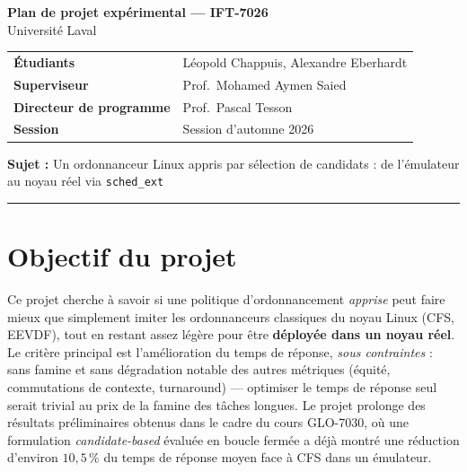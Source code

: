 \documentclass[11pt,a4paper]{article}
\newcommand{\projetTitre}{Plan de projet expérimental — IFT-7026}
\newcommand{\projetSujet}{Un ordonnanceur Linux appris par sélection de
  candidats : de l'émulateur au noyau réel via \texttt{sched\_ext}}
\newcommand{\projetSuperviseur}{Prof.\ Mohamed Aymen Saied}
\newcommand{\projetDirecteur}{Prof.\ Pascal Tesson}
\newcommand{\projetEtudiantUn}{Léopold Chappuis}
\newcommand{\projetEtudiantDeux}{Alexandre Eberhardt}
\newcommand{\projetSession}{Session d'automne 2026}
\newcommand{\projetUniversite}{Université Laval}
\begin{document}
\begin{center}
  {\LARGE\bfseries \projetTitre}\\[0.4em]
  {\large \projetUniversite}
\end{center}

\vspace{0.8em}
\noindent
\begin{tabular}{@{}ll@{}}
  \textbf{Étudiants}              & \projetEtudiantUn{}, \projetEtudiantDeux \\
  \textbf{Superviseur}            & \projetSuperviseur \\
  \textbf{Directeur de programme} & \projetDirecteur \\
  \textbf{Session}                & \projetSession \\
\end{tabular}

\vspace{0.6em}
\noindent\textbf{Sujet :} \projetSujet

\vspace{0.4em}
\hrule
\vspace{1.2em}

\section{Objectif du projet}
Ce projet cherche à savoir si une politique d'ordonnancement \emph{apprise} peut
faire mieux que simplement imiter les ordonnanceurs classiques du noyau Linux
(CFS, EEVDF), tout en restant assez légère pour être \textbf{déployée dans un
noyau réel}. Le critère principal est l'amélioration du temps de réponse,
\emph{sous contraintes} : sans famine et sans dégradation notable des autres
métriques (équité, commutations de contexte, turnaround) — optimiser le temps
de réponse seul serait trivial au prix de la famine des tâches longues. Le
projet prolonge des résultats préliminaires obtenus dans le
cadre du cours GLO-7030, où une formulation \emph{candidate-based} évaluée en
boucle fermée a déjà montré une réduction d'environ \mbox{$10{,}5\,\%$} du
temps de réponse moyen face à CFS dans un émulateur.
\end{document}
